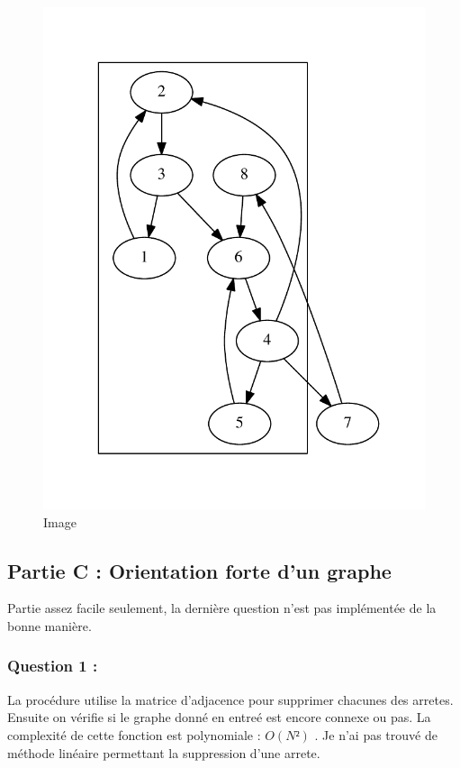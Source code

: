 \documentclass[]{article}
\begin{document}
\begin{figure}[htbp]
\centering
\includegraphics{./Images/orifortecfc.pdf}
\caption{Image}
\end{figure}

\subsection{Partie C : Orientation forte d'un
graphe}\label{partie-c-orientation-forte-dun-graphe}

Partie assez facile seulement, la dernière question n'est pas
implémentée de la bonne manière.

\subsubsection{Question 1 :}\label{question-1-1}

La procédure utilise la matrice d'adjacence pour supprimer chacunes des
arretes. Ensuite on vérifie si le graphe donné en entreé est encore
connexe ou pas. La complexité de cette fonction est polynomiale :
\(O(N²)\) . Je n'ai pas trouvé de méthode linéaire permettant la
suppression d'une arrete.
\end{document}
